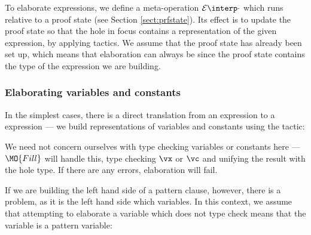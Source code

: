 

To elaborate expressions, we define a meta-operation $\ttinterp{\cdot}$ which
runs relative to a proof state (see Section \ref{sect:prfstate}).  Its effect is
to update the proof state so that the hole in focus contains a representation
of the given expression, by applying tactics. We assume that the proof state
has already been set up, which means that elaboration can always be
 since the proof state contains the type of the expression we
are building.

\subsubsection{Elaborating variables and constants}

In the simplest cases, there is a direct translation from an \IdrisM{} expression to
a \TT{} expression --- we build \TT{} representations of variables and constants using
the  tactic:


We need not concern ourselves with type checking variables or constants here --- $\MO{Fill}$
will handle this, type checking $\vx$ or $\vc$ and unifying the result with the
hole type. If there are any errors, elaboration will fail.

If we are building the left hand side of a pattern clause, however, there is a problem,
as it is the left hand side which  variables. In this context, we assume
that attempting to elaborate a variable which does not type check means that the variable
is a pattern variable:


